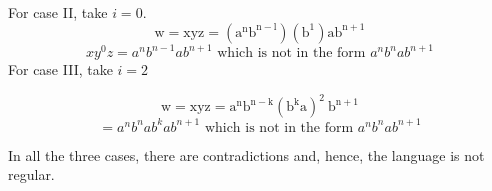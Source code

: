 \documentclass [7pt]{beamer}
\begin{document}
\begin{frame}	
For case II, take $i=0$.
$$\mathrm{w}=\mathrm{xyz}=\left(\mathrm{a}^{\mathrm{n}} \mathrm{b}^{\mathrm{n}-\mathrm{l}}\right)\left(\mathrm{b}^{\mathrm{1}}\right) \mathrm{a} \mathrm{b}^{\mathrm{n}+1}$$
$$x y^{0} z=a^{n} b^{n-1} a b^{n+1} \text { which is not in the form } a^{n} b^{n} a b^{n+1}$$
For case III, take $i=2$

$$\mathrm{w}=\mathrm{xyz}=\mathrm{a}^{\mathrm{n}} \mathrm{b}^{\mathrm{n}-\mathrm{k}}\left(\mathrm{b}^{\mathrm{k}} \mathrm{a}\right)^{2} \mathrm{~b}^{\mathrm{n}+1}$$
$$
=a^{n} b^{n} a b^{k} a b^{n+1} \text { which is not in the form } a^{n} b^{n} a b^{n+1}
$$

In all the three cases, there are contradictions and, hence, the language is not regular.
\end{frame}
\end{document}
